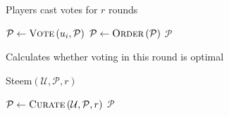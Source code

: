     \begin{algorithm}[H]
      \caption{Players cast votes for $r$ rounds}
      \label{alg:curation}
      \begin{algorithmic}[1]
              \State $\mathcal{P} \leftarrow \textsc{Vote}\left(u_i,
              \mathcal{P}\right)$
            \EndIf
          \EndFor
          \State $\mathcal{P} \leftarrow \textsc{Order}\left(\mathcal{P}\right)$
        \EndFor
        \State \Return $\mathcal{P}$
      \EndFunction
      \end{algorithmic}
    \end{algorithm}

    \begin{algorithm}[H]
      \caption{Calculates whether voting in this round is optimal}
      \label{alg:isvoteround}
      \begin{algorithmic}[1]
          \State 
        \EndFunction
      \end{algorithmic}
    \end{algorithm}

    \begin{algorithm}[H]
      \caption{Steem$\left(\mathcal{U}, \mathcal{P}, r\right)$}
      \label{alg:main}
      \begin{algorithmic}[1]
      \State $\mathcal{P} \leftarrow \textsc{Curate}\left(\mathcal{U},
      \mathcal{P}, r\right)$
      \State \Return $\mathcal{P}$
      \end{algorithmic}
    \end{algorithm}
